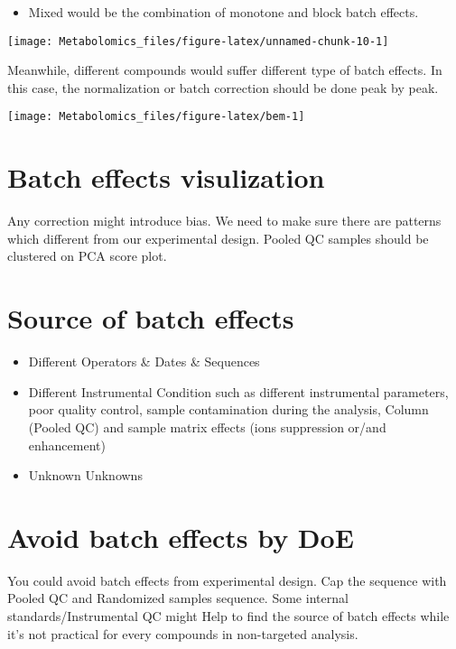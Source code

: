 \documentclass[
]{book}
\providecommand{\tightlist}{%
  \setlength{\itemsep}{0pt}\setlength{\parskip}{0pt}}
\begin{document}
\begin{itemize}
\tightlist
\item
  Mixed would be the combination of monotone and block batch effects.
\end{itemize}

\texttt{[image: Metabolomics\_files/figure-latex/unnamed-chunk-10-1]}

Meanwhile, different compounds would suffer different type of batch effects. In this case, the normalization or batch correction should be done peak by peak.

\texttt{[image: Metabolomics\_files/figure-latex/bem-1]}

\hypertarget{batch-effects-visulization}{%
\section{Batch effects visulization}\label{batch-effects-visulization}}

Any correction might introduce bias. We need to make sure there are patterns which different from our experimental design. Pooled QC samples should be clustered on PCA score plot.

\hypertarget{source-of-batch-effects}{%
\section{Source of batch effects}\label{source-of-batch-effects}}

\begin{itemize}
\item
  Different Operators \& Dates \& Sequences
\item
  Different Instrumental Condition such as different instrumental parameters, poor quality control, sample contamination during the analysis, Column (Pooled QC) and sample matrix effects (ions suppression or/and enhancement)
\item
  Unknown Unknowns
\end{itemize}

\hypertarget{avoid-batch-effects-by-doe}{%
\section{Avoid batch effects by DoE}\label{avoid-batch-effects-by-doe}}

You could avoid batch effects from experimental design. Cap the sequence with Pooled QC and Randomized samples sequence. Some internal standards/Instrumental QC might Help to find the source of batch effects while it's not practical for every compounds in non-targeted analysis.
\end{document}
